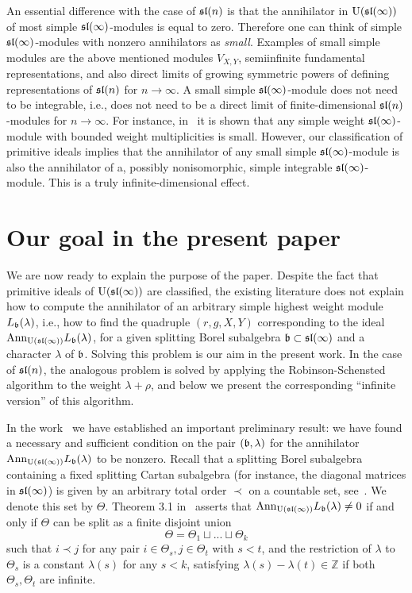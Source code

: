 \documentclass[10pt]{amsart}\oddsidemargin -1mm \evensidemargin -1mm \topmargin -15mm\headheight5mm \headsep 3.5mm \textheight 245mm\textwidth 170mm
\theoremstyle{definition}\newtheorem{theorem}{Theorem}[section]\newtheorem{lemma}[theorem]{Lemma}\newtheorem{remark}[theorem]{Remark}\newtheorem{proposition}[theorem]{Proposition}\newtheorem{corollary}[theorem]{Corollary}\newtheorem{definition}[theorem]{Definition}\newtheorem{Ex}[theorem]{Example}\newtheorem{obs}[theorem]{Observation}\newtheorem{nota}[theorem]{Notation}
\begin{document}
An essential difference with the case of $\frak{sl}(n)$ is that the annihilator in ${\rm U}(\frak{sl}(\infty))$ of most simple $\frak{sl}(\infty)$-modules is equal to zero. 
Therefore one can think of simple $\frak{sl}(\infty)$-modules with nonzero annihilators as {\it small}. 
Examples of small simple modules are the above mentioned modules $V_{{X}, {Y}}$, semiinfinite fundamental representations, and also direct limits of growing symmetric powers of defining representations of $\frak{sl}(n)$ for $n\to\infty$. 
A small simple $\frak{sl}(\infty)$-module does not need to be integrable, i.e., does not need to be a direct limit of finite-dimensional $\frak{sl}(n)$-modules for $n\to\infty$. 
For instance, in~\cite{GP} it is shown that any simple weight $\frak{sl}(\infty)$-module with bounded weight multiplicities is small. 
However, our classification of primitive ideals implies that the annihilator of any small simple $\frak{sl}(\infty)$-module is also the annihilator of a, possibly nonisomorphic, simple integrable $\frak{sl}(\infty)$-module. 
This is a  truly infinite-dimensional effect.

\section{Our goal in the present paper}

We are now ready to explain the purpose of the paper. 
Despite the fact that primitive ideals of ${\rm U}(\frak{sl}(\infty))$ are classified, the existing literature does not explain how to compute the annihilator of an arbitrary simple highest weight module $L_\frak b(\lambda)$, i.e.,  how to find the quadruple $(r, g, {X}, {Y})$ corresponding to the ideal ${\rm Ann}_{{\rm U}(\frak{sl}(\infty))}L_\frak b(\lambda)$, for a given splitting Borel subalgebra $\frak b\subset\frak{sl}(\infty)$ and a character $\lambda$ of $\frak b$. 
Solving this problem is our aim in the present work. 
In the case of $\frak{sl}(n)$, the analogous problem is solved by applying the Robinson-Schensted algorithm to the weight $\lambda+\rho$, and below we present the corresponding ``infinite version'' of this algorithm. 

In the work~\cite{PP2} we have established an important preliminary result: we have found a necessary and sufficient condition on the pair $(\frak b, \lambda)$ for the annihilator ${\rm Ann}_{{\rm U}(\frak{sl}(\infty))}L_\frak b(\lambda)$ to be nonzero. 
Recall that a splitting Borel subalgebra containing a fixed splitting Cartan subalgebra (for instance, the diagonal matrices in $\frak{sl}(\infty)$) is given by an arbitrary total order $\prec$ on a countable set, see~\cite{DP}. 
We denote this set by $\Theta$. 
Theorem 3.1 in~\cite{PP2} asserts that ${\rm Ann}_{{\rm U}(\frak{sl}(\infty))}L_\frak b(\lambda)\ne0$ if and only if $\Theta$ can be split as a finite disjoint union
$$\Theta=\Theta_1\sqcup...\sqcup \Theta_k$$
such that $i\prec j$ for any pair $i\in \Theta_s, j\in \Theta_t$ with $s<t$, and the restriction of $\lambda$ to $\Theta_s$ is a  constant $\lambda(s)$ for any $s<k$, satisfying $\lambda(s)-\lambda(t)\in\mathbb Z$ if both $\Theta_s, \Theta_t$ are infinite. 
\end{document}
